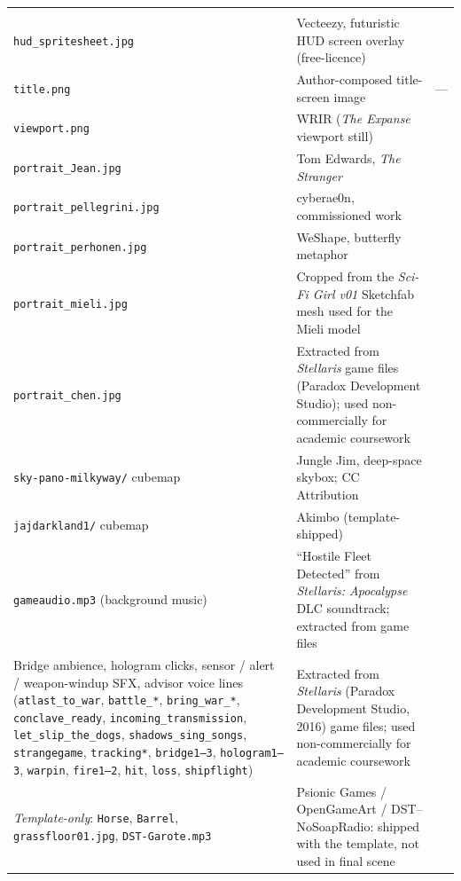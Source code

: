 \documentclass[11pt,a4paper]{article}
\begin{document}
\begin{center}
\begin{longtable}{p{4.5cm} p{6.5cm} p{3.0cm}}
  & \cite{template_in3005} \\
\texttt{hud\_spritesheet.jpg}
  & Vecteezy, futuristic HUD screen overlay (free-licence)
  & \cite{tex_hud_spritesheet} \\
\texttt{title.png}
  & Author-composed title-screen image
  & --- \\
\texttt{viewport.png}
  & WRIR (\textit{The Expanse} viewport still)
  & \cite{tex_viewport} \\
\texttt{portrait\_Jean.jpg}
  & Tom Edwards, \textit{The Stranger}
  & \cite{portrait_jean} \\
\texttt{portrait\_pellegrini.jpg}
  & cyberae0n, commissioned work
  & \cite{portrait_pellegrini} \\
\texttt{portrait\_perhonen.jpg}
  & WeShape, butterfly metaphor
  & \cite{portrait_perhonen} \\
\texttt{portrait\_mieli.jpg}
  & Cropped from the \emph{Sci-Fi Girl v01} Sketchfab mesh used for the Mieli model
  & \cite{model_mieli} \\
\texttt{portrait\_chen.jpg}
  & Extracted from \emph{Stellaris} game files (Paradox Development Studio); used non-commercially for academic coursework
  & \cite{stellaris} \\
\texttt{sky-pano-milkyway/} cubemap
  & Jungle Jim, deep-space skybox; CC Attribution
  & \cite{skybox_milkyway} \\
\texttt{jajdarkland1/} cubemap
  & Akimbo (template-shipped)
  & \cite{skybox_akimbo} \\
\texttt{gameaudio.mp3} (background music)
  & ``Hostile Fleet Detected'' from \emph{Stellaris: Apocalypse} DLC soundtrack; extracted from game files
  & \cite{stellaris} \\
Bridge ambience, hologram clicks, sensor / alert / weapon-windup SFX, advisor voice lines (\texttt{atlast\_to\_war}, \texttt{battle\_*}, \texttt{bring\_war\_*}, \texttt{conclave\_ready}, \texttt{incoming\_transmission}, \texttt{let\_slip\_the\_dogs}, \texttt{shadows\_sing\_songs}, \texttt{strangegame}, \texttt{tracking*}, \texttt{bridge1--3}, \texttt{hologram1--3}, \texttt{warpin}, \texttt{fire1--2}, \texttt{hit}, \texttt{loss}, \texttt{shipflight})
  & Extracted from \emph{Stellaris} (Paradox Development Studio, 2016) game files; used non-commercially for academic coursework
  & \cite{stellaris} \\
\textit{Template-only}: \texttt{Horse}, \texttt{Barrel}, \texttt{grassfloor01.jpg}, \texttt{DST-Garote.mp3}
  & Psionic Games / OpenGameArt / DST--NoSoapRadio: shipped with the template, not used in final scene
  & \cite{model_horse,model_barrel,tex_grass,music_garote} \\
\bottomrule
\end{longtable}
\end{center}
\end{document}
